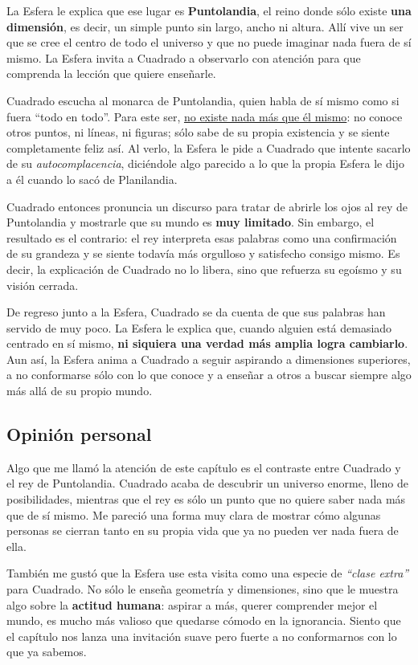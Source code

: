 \documentclass{article}
\begin{document}
La Esfera le explica que ese lugar es \textcolor{Apple Green}{\textbf{Puntolandia}}, el reino donde sólo existe \textbf{una dimensión}, es decir, un simple punto sin largo, ancho ni altura. Allí vive un ser que se cree el centro de todo el universo y que no puede imaginar nada fuera de sí mismo. La Esfera invita a Cuadrado a observarlo con atención para que comprenda la lección que quiere enseñarle.

Cuadrado escucha al monarca de Puntolandia, quien habla de sí mismo como si fuera “todo en todo”. Para este ser, \underline{no existe nada más que él mismo}: no conoce otros puntos, ni líneas, ni figuras; sólo sabe de su propia existencia y se siente completamente feliz así. Al verlo, la Esfera le pide a Cuadrado que intente sacarlo de su \emph{autocomplacencia}, diciéndole algo parecido a lo que la propia Esfera le dijo a él cuando lo sacó de Planilandia.

Cuadrado entonces pronuncia un discurso para tratar de abrirle los ojos al rey de Puntolandia y mostrarle que su mundo es \textbf{muy limitado}. Sin embargo, el resultado es el contrario: el rey interpreta esas palabras como una confirmación de su grandeza y se siente todavía más orgulloso y satisfecho consigo mismo. Es decir, la explicación de Cuadrado no lo libera, sino que refuerza su egoísmo y su visión cerrada.

De regreso junto a la Esfera, Cuadrado se da cuenta de que sus palabras han servido de muy poco. La Esfera le explica que, cuando alguien está demasiado centrado en sí mismo, \textbf{ni siquiera una verdad más amplia logra cambiarlo}. Aun así, la Esfera anima a Cuadrado a seguir aspirando a dimensiones superiores, a no conformarse sólo con lo que conoce y a enseñar a otros a buscar siempre algo más allá de su propio mundo.

\subsection*{Opinión personal}

Algo que me llamó la atención de este capítulo es el contraste entre Cuadrado y el rey de Puntolandia. Cuadrado acaba de descubrir un universo enorme, lleno de posibilidades, mientras que el rey es sólo un punto que no quiere saber nada más que de sí mismo. Me pareció una forma muy clara de mostrar cómo algunas personas se cierran tanto en su propia vida que ya no pueden ver nada fuera de ella.

También me gustó que la Esfera use esta visita como una especie de \emph{“clase extra”} para Cuadrado. No sólo le enseña geometría y dimensiones, sino que le muestra algo sobre la \textbf{actitud humana}: aspirar a más, querer comprender mejor el mundo, es mucho más valioso que quedarse cómodo en la ignorancia. Siento que el capítulo nos lanza una invitación suave pero fuerte a no conformarnos con lo que ya sabemos.
\end{document}
